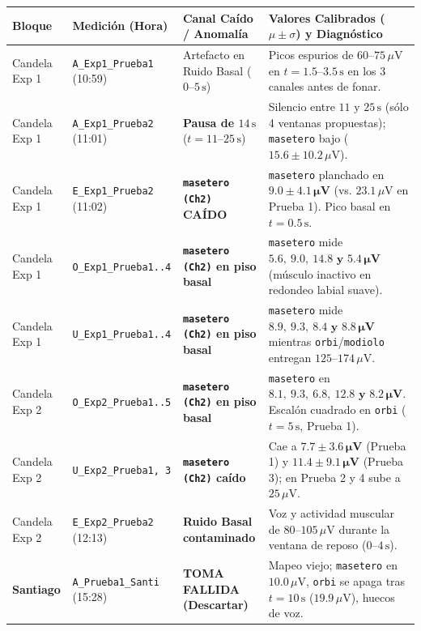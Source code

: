 \documentclass[11pt,a4paper]{article}
\begin{document}
\begin{table}[H]
\centering
\scriptsize
\begin{tabularx}{\textwidth}{l l p{3.6cm} X}
\toprule
\textbf{Bloque} & \textbf{Medición (Hora)} & \textbf{Canal Caído / Anomalía} & \textbf{Valores Calibrados ($\mu \pm \sigma$) y Diagnóstico} \\
\midrule
Candela Exp 1 & \texttt{A\_Exp1\_Prueba1} (10:59) & Artefacto en Ruido Basal ($0\text{--}5\,\text{s}$) & Picos espurios de $60\text{--}75\,\mu\text{V}$ en $t=1.5\text{--}3.5\,\text{s}$ en los 3 canales antes de fonar. \\
Candela Exp 1 & \texttt{A\_Exp1\_Prueba2} (11:01) & \textbf{Pausa de $14\,\text{s}$} ($t=11\text{--}25\,\text{s}$) & Silencio entre $11\text{ y }25\,\text{s}$ (sólo 4 ventanas propuestas); \texttt{masetero} bajo ($15.6 \pm 10.2\,\mu\text{V}$). \\
Candela Exp 1 & \texttt{E\_Exp1\_Prueba2} (11:02) & \textbf{\texttt{masetero (Ch2)} CAÍDO} & \texttt{masetero} planchado en $\mathbf{9.0 \pm 4.1\,\mu\text{V}}$ (vs. $23.1\,\mu\text{V}$ en Prueba 1). Pico basal en $t=0.5\,\text{s}$. \\
Candela Exp 1 & \texttt{O\_Exp1\_Prueba1..4} & \textbf{\texttt{masetero (Ch2)} en piso basal} & \texttt{masetero} mide $\mathbf{5.6,\ 9.0,\ 14.8\text{ y }5.4\,\mu\text{V}}$ (músculo inactivo en redondeo labial suave). \\
Candela Exp 1 & \texttt{U\_Exp1\_Prueba1..4} & \textbf{\texttt{masetero (Ch2)} en piso basal} & \texttt{masetero} mide $\mathbf{8.9,\ 9.3,\ 8.4\text{ y }8.8\,\mu\text{V}}$ mientras \texttt{orbi}/\texttt{modiolo} entregan $125\text{--}174\,\mu\text{V}$. \\
Candela Exp 2 & \texttt{O\_Exp2\_Prueba1..5} & \textbf{\texttt{masetero (Ch2)} en piso basal} & \texttt{masetero} en $\mathbf{8.1,\ 9.3,\ 6.8,\ 12.8\text{ y }8.2\,\mu\text{V}}$. Escalón cuadrado en \texttt{orbi} ($t=5\,\text{s}$, Prueba 1). \\
Candela Exp 2 & \texttt{U\_Exp2\_Prueba1, 3} & \textbf{\texttt{masetero (Ch2)} caído} & Cae a $\mathbf{7.7 \pm 3.6\,\mu\text{V}}$ (Prueba 1) y $\mathbf{11.4 \pm 9.1\,\mu\text{V}}$ (Prueba 3); en Prueba 2 y 4 sube a $25\,\mu\text{V}$. \\
Candela Exp 2 & \texttt{E\_Exp2\_Prueba2} (12:13) & \textbf{Ruido Basal contaminado} & Voz y actividad muscular de $80\text{--}105\,\mu\text{V}$ durante la ventana de reposo ($0\text{--}4\,\text{s}$). \\
\midrule
\textbf{Santiago} & \texttt{A\_Prueba1\_Santi} (15:28) & \textbf{TOMA FALLIDA (Descartar)} & Mapeo viejo; \texttt{masetero} en $10.0\,\mu\text{V}$, \texttt{orbi} se apaga tras $t=10\,\text{s}$ ($19.9\,\mu\text{V}$), huecos de voz. \\

\end{tabularx}
\end{table}
\end{document}
